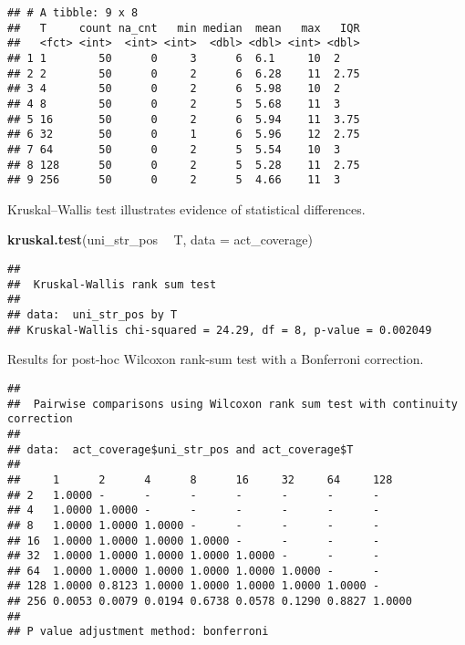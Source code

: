 \documentclass[]{book}
\newenvironment{Shaded}{\begin{snugshade}}{\end{snugshade}}
\newcommand{\DataTypeTok}[1]{\textcolor[rgb]{0.13,0.29,0.53}{#1}}
\newcommand{\KeywordTok}[1]{\textcolor[rgb]{0.13,0.29,0.53}{\textbf{#1}}}
\newcommand{\NormalTok}[1]{#1}
\newcommand{\OperatorTok}[1]{\textcolor[rgb]{0.81,0.36,0.00}{\textbf{#1}}}
\newcommand{\OtherTok}[1]{\textcolor[rgb]{0.56,0.35,0.01}{#1}}
\newcommand{\StringTok}[1]{\textcolor[rgb]{0.31,0.60,0.02}{#1}}
\begin{document}
\begin{verbatim}
## # A tibble: 9 x 8
##   T     count na_cnt   min median  mean   max   IQR
##   <fct> <int>  <int> <int>  <dbl> <dbl> <int> <dbl>
## 1 1        50      0     3      6  6.1     10  2   
## 2 2        50      0     2      6  6.28    11  2.75
## 3 4        50      0     2      6  5.98    10  2   
## 4 8        50      0     2      5  5.68    11  3   
## 5 16       50      0     2      6  5.94    11  3.75
## 6 32       50      0     1      6  5.96    12  2.75
## 7 64       50      0     2      5  5.54    10  3   
## 8 128      50      0     2      5  5.28    11  2.75
## 9 256      50      0     2      5  4.66    11  3
\end{verbatim}

Kruskal--Wallis test illustrates evidence of statistical differences.

\begin{Shaded}
\begin{Highlighting}[]
\KeywordTok{kruskal.test}\NormalTok{(uni_str_pos }\OperatorTok{~}\StringTok{ }\NormalTok{T, }\DataTypeTok{data =}\NormalTok{ act_coverage)}
\end{Highlighting}
\end{Shaded}

\begin{verbatim}
## 
##  Kruskal-Wallis rank sum test
## 
## data:  uni_str_pos by T
## Kruskal-Wallis chi-squared = 24.29, df = 8, p-value = 0.002049
\end{verbatim}

Results for post-hoc Wilcoxon rank-sum test with a Bonferroni correction.

\begin{Shaded}
\end{Shaded}

\begin{verbatim}
## 
##  Pairwise comparisons using Wilcoxon rank sum test with continuity correction 
## 
## data:  act_coverage$uni_str_pos and act_coverage$T 
## 
##     1      2      4      8      16     32     64     128   
## 2   1.0000 -      -      -      -      -      -      -     
## 4   1.0000 1.0000 -      -      -      -      -      -     
## 8   1.0000 1.0000 1.0000 -      -      -      -      -     
## 16  1.0000 1.0000 1.0000 1.0000 -      -      -      -     
## 32  1.0000 1.0000 1.0000 1.0000 1.0000 -      -      -     
## 64  1.0000 1.0000 1.0000 1.0000 1.0000 1.0000 -      -     
## 128 1.0000 0.8123 1.0000 1.0000 1.0000 1.0000 1.0000 -     
## 256 0.0053 0.0079 0.0194 0.6738 0.0578 0.1290 0.8827 1.0000
## 
## P value adjustment method: bonferroni
\end{verbatim}
\end{document}
